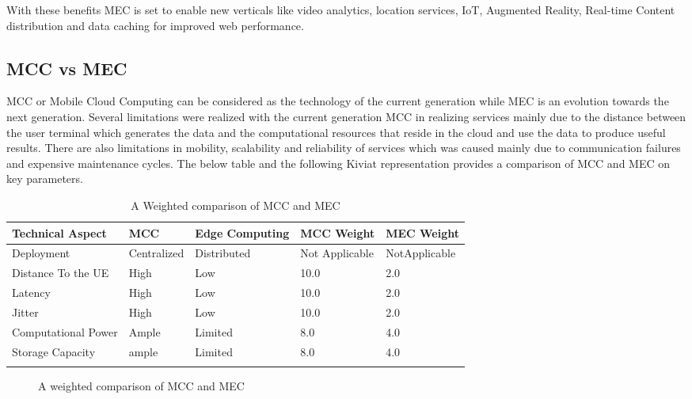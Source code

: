 With these benefits MEC is set to enable new verticals like video analytics, location services, IoT, Augmented Reality, Real-time Content distribution and data caching for improved web performance. 

\subsection{MCC vs MEC}

MCC or Mobile Cloud Computing can be considered as the technology of the current generation while MEC is an evolution towards the next generation. Several limitations were realized with the current generation MCC in realizing services mainly due to the distance between the user terminal which generates the data and the computational resources that reside in the cloud and use the data to produce useful results. There are also limitations in mobility, scalability and reliability of services which was caused mainly due to communication failures and expensive maintenance cycles. The below table and the following Kiviat representation provides a comparison of MCC and MEC on key parameters.


\begin{longtable}[H]{|p{}|p{}|p{}|p{}|p{}|}
\hline\hline
Technical Aspect&MCC&Edge Computing&MCC Weight&MEC Weight\\
\hline\hline
\hline
Deployment&Centralized&Distributed&Not Applicable&NotApplicable\\
\hline
Distance To the UE&High&Low&10.0&2.0\\
\hline
Latency&High&Low&10.0&2.0\\
\hline
Jitter&High&Low&10.0&2.0\\
\hline
Computational Power&Ample&Limited&8.0&4.0\\
\hline
Storage Capacity&ample&Limited&8.0&4.0\\
\hline
\hline\hline

\caption{A Weighted comparison of MCC and MEC}
\label{tab:tab1}
\end{longtable}

\begin{figure}
	\label{fig:figure2}
	\caption{A weighted comparison of MCC and MEC}
\end{figure}
